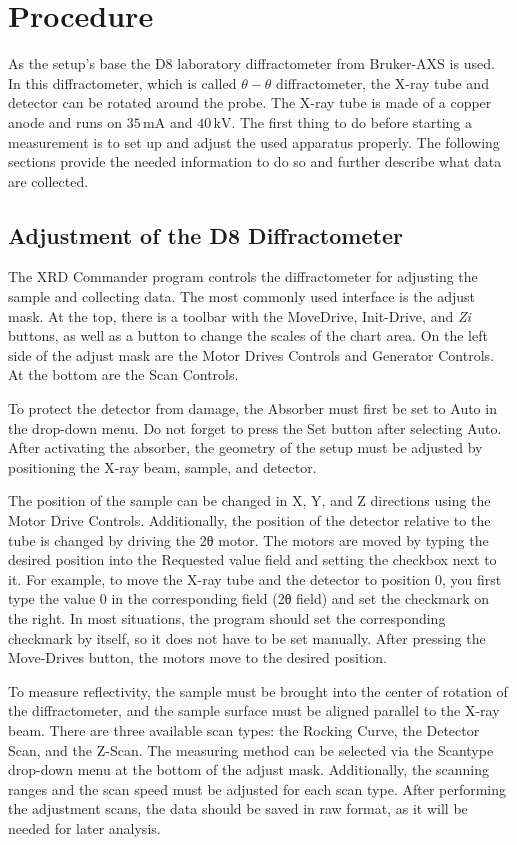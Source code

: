 \section{Procedure}

As the setup's base the D8 laboratory diffractometer from Bruker-AXS is used.
In this diffractometer, which is called $\theta - \theta$ diffractometer, the X-ray tube and detector can be rotated around the probe.
The X-ray tube is made of a copper anode and runs on $35\, \unit{\milli \ampere}$ and $40\, \unit{\kilo \volt}$.
The first thing to do before starting a measurement is to set up and adjust the used apparatus properly. 
The following sections provide the needed information to do so and further describe what data are collected.


\subsection{Adjustment of the D8 Diffractometer}
The XRD Commander program controls the diffractometer for adjusting the sample and collecting data. The most commonly used interface is the adjust mask. At the top, there is a toolbar with the MoveDrive, Init-Drive, and \textit{Zi} buttons, as well as a button to change the scales of the chart area. On the left side of the adjust mask are the Motor Drives Controls and Generator Controls. At the bottom are the Scan Controls.

To protect the detector from damage, the Absorber must first be set to Auto in the drop-down menu. Do not forget to press the Set button after selecting Auto. After activating the absorber, the geometry of the setup must be adjusted by positioning the X-ray beam, sample, and detector.

The position of the sample can be changed in X, Y, and Z directions using the Motor Drive Controls. Additionally, the position of the detector relative to the tube is changed by driving the 2θ motor. The motors are moved by typing the desired position into the Requested value field and setting the checkbox next to it. For example, to move the X-ray tube and the detector to position 0, you first type the value 0 in the corresponding field (2θ field) and set the checkmark on the right. In most situations, the program should set the corresponding checkmark by itself, so it does not have to be set manually. After pressing the Move-Drives button, the motors move to the desired position.

To measure reflectivity, the sample must be brought into the center of rotation of the diffractometer, and the sample surface must be aligned parallel to the X-ray beam. There are three available scan types: the Rocking Curve, the Detector Scan, and the Z-Scan. The measuring method can be selected via the Scantype drop-down menu at the bottom of the adjust mask. Additionally, the scanning ranges and the scan speed must be adjusted for each scan type. After performing the adjustment scans, the data should be saved in raw format, as it will be needed for later analysis.

